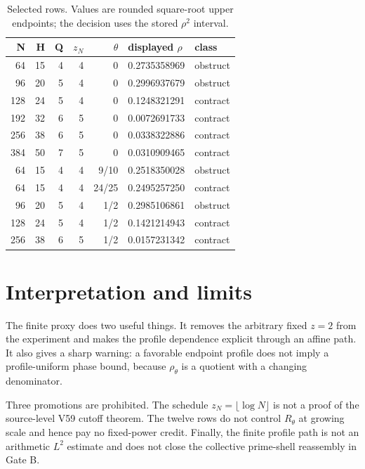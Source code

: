 \documentclass[11pt]{article}
\begin{document}
\begin{table}[t]
\centering
\caption{Selected rows. Values are rounded square-root upper endpoints; the
decision uses the stored $\rho^2$ interval.}
\small
\begin{tabular}{rrrrrll}
\toprule
N&H&Q&$z_N$&$\theta$&displayed $\rho$&class\\
\midrule
64&15&4&4&0&0.2735358969&obstruct\\
96&20&5&4&0&0.2996937679&obstruct\\
128&24&5&4&0&0.1248321291&contract\\
192&32&6&5&0&0.0072691733&contract\\
256&38&6&5&0&0.0338322886&contract\\
384&50&7&5&0&0.0310909465&contract\\
64&15&4&4&9/10&0.2518350028&obstruct\\
64&15&4&4&24/25&0.2495257250&contract\\
96&20&5&4&1/2&0.2985106861&obstruct\\
128&24&5&4&1/2&0.1421214943&contract\\
256&38&6&5&1/2&0.0157231342&contract\\
\bottomrule
\end{tabular}
\end{table}
\section{Interpretation and limits}
The finite proxy does two useful things. It removes the arbitrary fixed $z=2$
from the experiment and makes the profile dependence explicit through an
affine path. It also gives a sharp warning: a favorable endpoint profile does
not imply a profile-uniform phase bound, because $\rho_\theta$ is a quotient
with a changing denominator.

Three promotions are prohibited. The schedule $z_N=\lfloor\log N\rfloor$ is
not a proof of the source-level V59 cutoff theorem. The twelve rows do not
control $R_\theta$ at growing scale and hence pay no fixed-power credit. Finally,
the finite profile path is not an arithmetic $L^2$ estimate and does not close
the collective prime-shell reassembly in Gate B.
\end{document}
